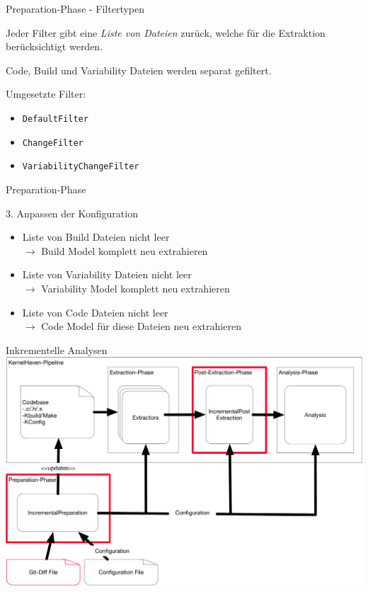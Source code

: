 \documentclass[aspectratio=43, noserifmath]{beamer}
\begin{document}
\begin{frame}[containsverbatim]{Preparation-Phase - Filtertypen}

Jeder Filter gibt eine \emph{Liste von Dateien} zur\"uck, welche f\"ur die Extraktion ber\"ucksichtigt werden.

Code, Build und Variability Dateien werden separat gefiltert.

Umgesetzte Filter:

\begin{itemize}
    \item[\textbullet] \texttt{DefaultFilter} 
    \item[\textbullet] \texttt{ChangeFilter}
    \item[\textbullet] \texttt{VariabilityChangeFilter}
\end{itemize}

\end{frame}

\begin{frame}{Preparation-Phase}

3. Anpassen der Konfiguration \\

\begin{itemize}
    \item[\textbullet] Liste von Build Dateien nicht leer \\ $\rightarrow$ Build Model \alert{komplett} neu extrahieren
    \pause
    \item[\textbullet] Liste von Variability Dateien nicht leer \\ $\rightarrow$ Variability Model \alert{komplett} neu extrahieren
    \pause
    \item[\textbullet] Liste von Code Dateien nicht leer \\ $\rightarrow$ Code Model \alert{f\"ur diese Dateien} neu extrahieren
\end{itemize}
\end{frame}


\begin{frame}[containsverbatim]{Inkrementelle Analysen}
\includegraphics[width=1\textwidth]{image/KernelHavenIncremental.pdf}
\end{frame}
\end{document}
